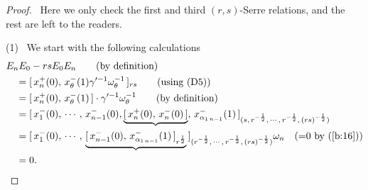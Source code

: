 \documentclass{amsproc}
\theoremstyle{remark}
\numberwithin{equation}{section}
\begin{document}
\begin{proof} \,  Here we only check the first and third $(r,s)$-Serre
relations, and the rest are left to the readers.

(1) \,  We start with the following calculations
\begin{eqnarray*}
\begin{split}
&E_nE_0-rsE_0E_n\qquad \hbox{(by definition)}\\
&\quad=[\,x_n^+(0),\,x_{\theta}^-(1)\gamma'^{-1}{\omega}_{\theta}^{-1}\,]_{rs}
\qquad \hbox{(using (D5))}\\
&\quad=[\,x_n^+(0),\,x_{\theta}^-(1)\,]\cdot \gamma'^{-1}{\omega}_{\theta}^{-1}
\qquad \hbox{(by definition)}\\
&\quad=[\,x_1^-(0),\,\cdots,\,x_{n-1}^-(0),\underbrace{[\,x_n^+(0),\,x_n^-(0)\,]},\,x_{\alpha_{1\,n-1}}^-(1)\,]
_{(s,\,r^{-\frac{1}{2}},\,\cdots,\,r^{-\frac{1}{2}},\,(rs)^{-\frac{1}{2}})}\\
&\quad=[\,x_1^-(0),\,\cdots,\,\underbrace{[\,x_{n-1}^-(0),\,x_{\alpha_{1\,n-1}}^-(1)\,]_{r^{\frac{1}{2}}}}\,]
_{(r^{-\frac{1}{2}},\,\cdots,\,r^{-\frac{1}{2}},\,(rs)^{-\frac{1}{2}})}{\omega}_n
\quad \hbox{(=0 by (\ref{b:16}))}\\
&\quad=0.
\end{split}
\end{eqnarray*}


\end{proof}
\end{document}
